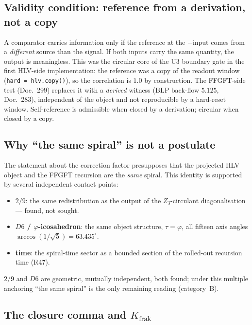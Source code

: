 \subsection*{Validity condition: reference from a derivation, not a copy}

A comparator carries information only if the reference at the $-$input comes
from a \emph{different} source than the signal. If both inputs carry the same
quantity, the output is meaningless. This was the circular core of the U3
boundary gate in the first HLV-side implementation: the reference was a copy of
the readout window (\texttt{hard = hlv.copy()}), so the correlation is $1{.}0$
by construction. The FFGFT-side test (Doc.~299) replaces it with a
\emph{derived} witness (BLP back-flow $5{.}125$, Doc.~283), independent of the
object and not reproducible by a hard-reset window. Self-reference is admissible
when closed by a derivation; circular when closed by a copy.

\subsection*{Why \enquote{the same spiral} is not a postulate}

The statement about the correction factor presupposes that the projected HLV
object and the FFGFT recursion are the \emph{same} spiral. This identity is
supported by several independent contact points:
\begin{itemize}
  \item \textbf{$2/9$}: the same redistribution as the output of the
    $Z_3$-circulant diagonalisation --- found, not sought.
  \item \textbf{$D6$ / $\varphi$-icosahedron}: the same object structure,
    $\tau=\varphi$, all fifteen axis angles $\arccos(1/\sqrt5)=63{.}435^\circ$.
  \item \textbf{time}: the spiral-time sector as a bounded section of the
    rolled-out recursion time (R47).
\end{itemize}
$2/9$ and $D6$ are geometric, mutually independent, both found; under this
multiple anchoring \enquote{the same spiral} is the only remaining reading
(category~B).

\subsection*{The closure comma and $K_{\text{frak}}$}

